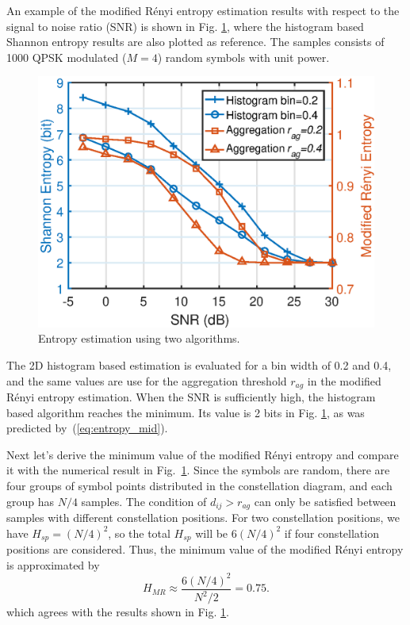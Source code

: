 \documentclass[journal,comsoc]{IEEEtran}
\begin{document}
An example of the modified R\'enyi entropy estimation results with respect to the signal to noise ratio (SNR) is shown in Fig. \ref{fig:adEnt}, where the histogram based Shannon entropy results are also plotted as reference.
The samples consists of 1000 QPSK modulated (\(M=4\)) random symbols with unit power.

\begin{figure}[ht]
\centering
\includegraphics[width=3 in]{pic/H_MR.eps}
\caption{Entropy estimation using two algorithms.}
\label{fig:adEnt} 
\end{figure}

The 2D histogram based estimation is evaluated for a bin width of 0.2 and 0.4, and the same values are use for the aggregation threshold \(r_{ag}\) in the modified R\'enyi entropy estimation.
When the SNR is sufficiently high, the histogram based algorithm reaches the minimum. 
Its value is 2 bits in Fig. \ref{fig:adEnt}, as was predicted by~(\ref{eq:entropy_mid}).

Next let's derive the minimum value of the modified R\'enyi entropy and compare it with the numerical result in Fig.~\ref{fig:adEnt}.
Since the symbols are random, there are four groups of symbol points distributed in the constellation diagram, and each group has \(N/4\) samples.
The condition of $d_{ij}>r_{ag}$ can only be satisfied between samples with different constellation positions.
For two constellation positions, we have $H_{sp} = (N/4)^2$, so the total $H_{sp}$ will be $6 (N/4)^2$ if four constellation positions are considered.
Thus, the minimum value of the modified R\'enyi entropy is approximated by
\begin{equation}
H_{MR} \approx \frac{ 6 \left(N/4\right)^2}{N^2/2}=0.75.
\label{eq:adEntQPSK}
\end{equation}
which agrees with the results shown in Fig. \ref{fig:adEnt}.
\end{document}
